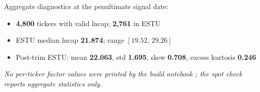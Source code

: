 \documentclass[11pt,a4paper]{article}
\newcommand{\NOTE}[1]{\textcolor{note}{\textit{#1}}}
\begin{document}
Aggregate diagnostics at the penultimate signal date:

\begin{itemize}[leftmargin=*,topsep=2pt,itemsep=2pt]
  \item \textbf{4{,}800} tickers with valid lncap; \textbf{2{,}761} in ESTU
  \item ESTU median lncap \textbf{21.874}; range $[19.52,\,29.26]$
  \item Post-trim ESTU: mean \textbf{22.063}, std \textbf{1.695}, skew \textbf{0.708}, excess kurtosis \textbf{0.246}
\end{itemize}

\NOTE{No per-ticker factor values were printed by the build notebook
; the spot check reports aggregate statistics only.}
\end{document}
